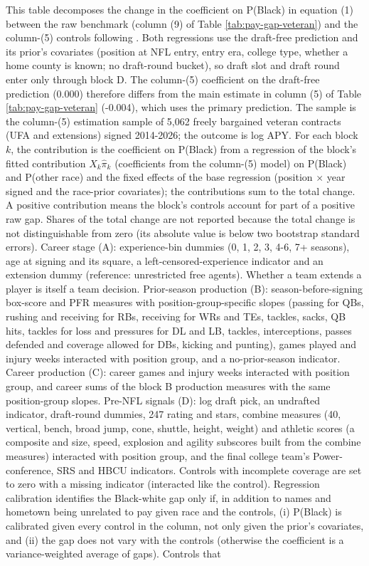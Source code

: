 \begin{table}[!h]
\begin{threeparttable}
\begin{tablenotes}[para]
\item This table decomposes the change in the coefficient on P(Black) in equation (1) between the raw benchmark (column (9) of Table \ref{tab:pay-gap-veteran}) and the column-(5) controls following \citet{gelbach2016covariates}. Both regressions use the draft-free prediction and its prior's covariates (position at NFL entry, entry era, college type, whether a home county is known; no draft-round bucket), so draft slot and draft round enter only through block D. The column-(5) coefficient on the draft-free prediction (0.000) therefore differs from the main estimate in column (5) of Table \ref{tab:pay-gap-veteran} (-0.004), which uses the primary prediction. The sample is the column-(5) estimation sample of 5,062 freely bargained veteran contracts (UFA and extensions) signed 2014-2026; the outcome is log APY. For each block $k$, the contribution is the coefficient on P(Black) from a regression of the block's fitted contribution $X_k\hat\pi_k$ (coefficients from the column-(5) model) on P(Black) and P(other race) and the fixed effects of the base regression (position $\times$ year signed and the race-prior covariates); the contributions sum to the total change. A positive contribution means the block's controls account for part of a positive raw gap. Shares of the total change are not reported because the total change is not distinguishable from zero (its absolute value is below two bootstrap standard errors). Career stage (A): experience-bin dummies (0, 1, 2, 3, 4-6, 7+ seasons), age at signing and its square, a left-censored-experience indicator and an extension dummy (reference: unrestricted free agents). Whether a team extends a player is itself a team decision. Prior-season production (B): season-before-signing box-score and PFR measures with position-group-specific slopes (passing for QBs, rushing and receiving for RBs, receiving for WRs and TEs, tackles, sacks, QB hits, tackles for loss and pressures for DL and LB, tackles, interceptions, passes defended and coverage allowed for DBs, kicking and punting), games played and injury weeks interacted with position group, and a no-prior-season indicator. Career production (C): career games and injury weeks interacted with position group, and career sums of the block B production measures with the same position-group slopes. Pre-NFL signals (D): log draft pick, an undrafted indicator, draft-round dummies, 247 rating and stars, combine measures (40, vertical, bench, broad jump, cone, shuttle, height, weight) and athletic scores (a composite and size, speed, explosion and agility subscores built from the combine measures) interacted with position group, and the final college team's Power-conference, SRS and HBCU indicators. Controls with incomplete coverage are set to zero with a missing indicator (interacted like the control). Regression calibration identifies the Black-white gap only if, in addition to names and hometown being unrelated to pay given race and the controls, (i) P(Black) is calibrated given every control in the column, not only given the prior's covariates, and (ii) the gap does not vary with the controls (otherwise the coefficient is a variance-weighted average of gaps). Controls that 
\end{tablenotes}
\end{threeparttable}
\end{table}
